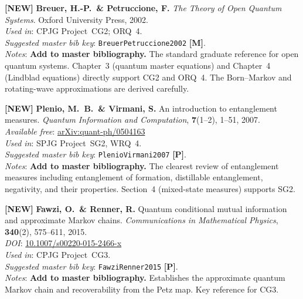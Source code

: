 \documentclass[11pt,a4paper]{article}
\begin{document}
\begin{enumerate}[leftmargin=2em, label={\textbf{[\arabic*]}}, itemsep=10pt, resume]
\item \textbf{[NEW]}
  \textbf{Breuer, H.-P.\ \& Petruccione, F.}
  \textit{The Theory of Open Quantum Systems}.
  Oxford University Press, 2002.\\
  \textit{Used in}: CPJG Project~CG2; ORQ~4.\\
  \textit{Suggested master bib key}: \texttt{BreuerPetruccione2002} \textbf{[M]}.\\
  \textit{Notes}: \textbf{Add to master bibliography.} The standard graduate
  reference for open quantum systems. Chapter~3 (quantum master equations) and
  Chapter~4 (Lindblad equations) directly support CG2 and ORQ~4.
  The Born--Markov and rotating-wave approximations are derived carefully.

\item \textbf{[NEW]}
  \textbf{Plenio, M.~B.\ \& Virmani, S.}
  An introduction to entanglement measures.
  \textit{Quantum Information and Computation}, \textbf{7}(1--2), 1--51, 2007.\\
  \textit{Available free}: \href{https://arxiv.org/abs/quant-ph/0504163}{arXiv:quant-ph/0504163}\\
  \textit{Used in}: SPJG Project~SG2, WRQ~4.\\
  \textit{Suggested master bib key}: \texttt{PlenioVirmani2007} \textbf{[P]}.\\
  \textit{Notes}: \textbf{Add to master bibliography.} The clearest review of
  entanglement measures including entanglement of formation, distillable entanglement,
  negativity, and their properties. Section~4 (mixed-state measures) supports SG2.

\item \textbf{[NEW]}
  \textbf{Fawzi, O.\ \& Renner, R.}
  Quantum conditional mutual information and approximate Markov chains.
  \textit{Communications in Mathematical Physics}, \textbf{340}(2), 575--611, 2015.\\
  \textit{DOI}: \href{https://doi.org/10.1007/s00220-015-2466-x}{10.1007/s00220-015-2466-x}\\
  \textit{Used in}: CPJG Project~CG3.\\
  \textit{Suggested master bib key}: \texttt{FawziRenner2015} \textbf{[P]}.\\
  \textit{Notes}: \textbf{Add to master bibliography.} Establishes the approximate
  quantum Markov chain and recoverability from the Petz map. Key reference for CG3.


\end{enumerate}
\end{document}
